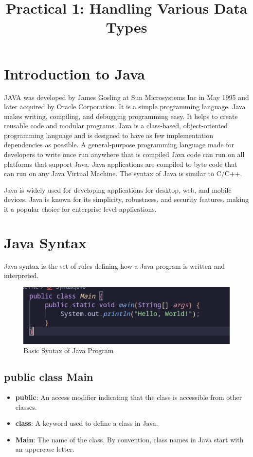 \documentclass[a4paper,12pt]{article}
\title{\textbf{Practical 1: Handling Various Data Types}}
\author{}
\date{}
\begin{document}
\maketitle

\section{Introduction to Java}
JAVA was developed by James Gosling at Sun Microsystems Inc in May 1995 and later acquired by Oracle Corporation. It is a simple programming language. Java makes writing, compiling, and debugging programming easy. It helps to create reusable code and modular programs. Java is a class-based, object-oriented programming language and is designed to have as few implementation dependencies as possible. A general-purpose programming language made for developers to write once run anywhere that is compiled Java code can run on all platforms that support Java. Java applications are compiled to byte code that can run on any Java Virtual Machine. The syntax of Java is similar to C/C++.

Java is widely used for developing applications for desktop, web, and mobile devices. Java is known for its simplicity, robustness, and security features, making it a popular choice for enterprise-level applications.

\section{Java Syntax}
Java syntax is the set of rules defining how a Java program is written and interpreted.
\begin{figure}[h]
    \centering
    \includegraphics[width=0.8\linewidth]{images/basic_syntax.png}
    \caption{Basic Syntax of Java Program}
    \label{fig:sample_image}
\end{figure}

\subsection*{public class Main}
\begin{itemize}[leftmargin=2cm]
    \item \textbf{public}: An access modifier indicating that the class is accessible from other classes.
    \item \textbf{class}: A keyword used to define a class in Java.
    \item \textbf{Main}: The name of the class. By convention, class names in Java start with an uppercase letter.
\end{itemize}
\end{document}
